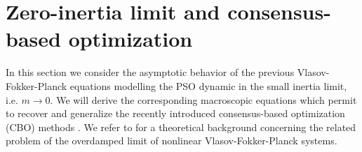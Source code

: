 \documentclass{ims9x6}
\newtheorem{assum}{Assumption}
\newcommand{\TE}{\mathcal{F}}
\newcommand{\RR}{\mathbb{R}}
\begin{document}
\section{Zero-inertia limit and consensus-based optimization}
In this section we consider the asymptotic behavior of the previous Vlasov-Fokker-Planck equations modelling the PSO dynamic in the small inertia limit, i.e. $m\to 0$. We will derive the corresponding macroscopic equations which permit to recover and generalize the recently introduced consensus-based optimization (CBO) methods \cite{carrillo2019consensus}. We refer to \cite{DLP,choi2020quantified} for a theoretical background concerning the related problem of the overdamped limit of nonlinear Vlasov-Fokker-Planck systems.
 
\end{document}
